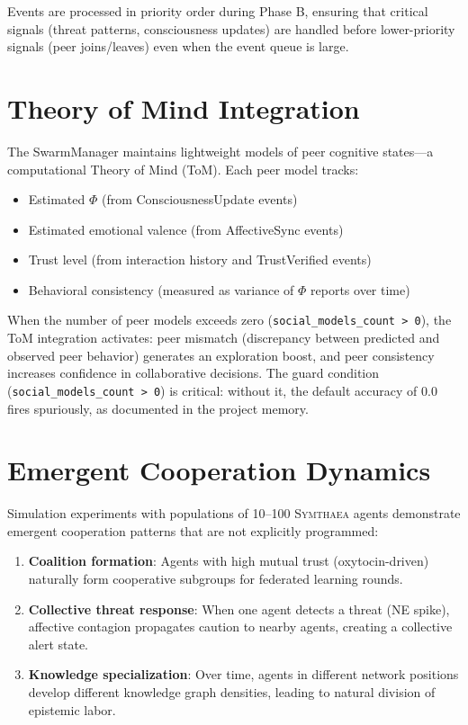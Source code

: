 \documentclass[12pt]{book}
\newcommand{\symthaea}{\textsc{Symthaea}}
\begin{document}
Events are processed in priority order during Phase B, ensuring that critical signals (threat patterns, consciousness updates) are handled before lower-priority signals (peer joins/leaves) even when the event queue is large.

\section{Theory of Mind Integration}

The SwarmManager maintains lightweight models of peer cognitive states---a computational Theory of Mind (ToM). Each peer model tracks:

\begin{itemize}
  \item Estimated $\Phi$ (from ConsciousnessUpdate events)
  \item Estimated emotional valence (from AffectiveSync events)
  \item Trust level (from interaction history and TrustVerified events)
  \item Behavioral consistency (measured as variance of $\Phi$ reports over time)
\end{itemize}

When the number of peer models exceeds zero (\texttt{social\_models\_count > 0}), the ToM integration activates: peer mismatch (discrepancy between predicted and observed peer behavior) generates an exploration boost, and peer consistency increases confidence in collaborative decisions. The guard condition (\texttt{social\_models\_count > 0}) is critical: without it, the default accuracy of 0.0 fires spuriously, as documented in the project memory.

\section{Emergent Cooperation Dynamics}

Simulation experiments with populations of 10--100 \symthaea{} agents demonstrate emergent cooperation patterns that are not explicitly programmed:

\begin{enumerate}
  \item \textbf{Coalition formation}: Agents with high mutual trust (oxytocin-driven) naturally form cooperative subgroups for federated learning rounds.
  \item \textbf{Collective threat response}: When one agent detects a threat (NE spike), affective contagion propagates caution to nearby agents, creating a collective alert state.
  \item \textbf{Knowledge specialization}: Over time, agents in different network positions develop different knowledge graph densities, leading to natural division of epistemic labor.
\end{enumerate}
\end{document}
